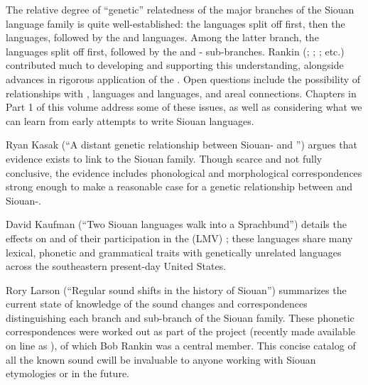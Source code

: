 \begin{refsection}

The relative degree of ``genetic'' relatedness of the major branches of the Siouan language family is quite well-established: the  languages split off first, then the  languages, followed by the  and  languages. Among the latter branch, the  languages split off first, followed by the  and - sub-branches. Rankin (\citeyear{Rankin1988}; \citeyear{Rankin1998macrosiouan}; \citealt{RankinEtAl1998}; etc.) contributed much to developing and supporting this understanding, alongside advances in rigorous application of the . Open questions include the possibility of relationships with ,  languages and  languages, and areal connections. Chapters in Part 1 of this volume address some of these issues, as well as considering what we can learn from early attempts to write Siouan languages.

Ryan Kasak (``A distant genetic relationship between Siouan- and '') argues that evidence exists to link  to the Siouan family. Though scarce and not fully conclusive, the evidence includes phonological and morphological correspondences strong enough to make a reasonable case for a genetic relationship between  and Siouan-. 

David Kaufman (``Two Siouan languages walk into a Sprachbund'') details the effects on  and  of their participation in the  (LMV) ; these languages share many lexical, phonetic and grammatical traits with genetically unrelated languages across the southeastern present-day United States. 

Rory Larson (``Regular sound shifts in the history of Siouan'') summarizes the current state of knowledge of the sound changes and correspondences distinguishing each branch and sub-branch of the Siouan family. These phonetic correspondences were worked out as part of the  project (recently made available on line as \citet{Rankinetal2015AccessSeptember}), of which Bob Rankin was a central member. This concise catalog of all the known sound cwill be invaluable to anyone working with Siouan etymologies or  in the future.


\end{refsection}
